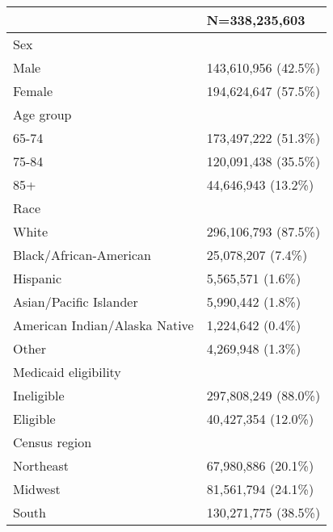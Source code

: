 \begin{table}[ht]
\centering
\begin{tabular}{ll}
  \hline
 & N=338,235,603 \\ 
  \hline
Sex &  \\ 
    \hspace{10pt}Male & 143,610,956 (42.5\%) \\ 
    \hspace{10pt}Female & 194,624,647 (57.5\%) \\ 
  Age group &  \\ 
    \hspace{10pt}65-74 & 173,497,222 (51.3\%) \\ 
    \hspace{10pt}75-84 & 120,091,438 (35.5\%) \\ 
    \hspace{10pt}85+ & 44,646,943 (13.2\%) \\ 
  Race &  \\ 
    \hspace{10pt}White & 296,106,793 (87.5\%) \\ 
    \hspace{10pt}Black/African-American & 25,078,207 (7.4\%) \\ 
    \hspace{10pt}Hispanic & 5,565,571 (1.6\%) \\ 
    \hspace{10pt}Asian/Pacific Islander & 5,990,442 (1.8\%) \\ 
    \hspace{10pt}American Indian/Alaska Native & 1,224,642 (0.4\%) \\ 
    \hspace{10pt}Other & 4,269,948 (1.3\%) \\ 
  Medicaid eligibility &  \\ 
    \hspace{10pt}Ineligible & 297,808,249 (88.0\%) \\ 
    \hspace{10pt}Eligible & 40,427,354 (12.0\%) \\ 
  Census region &  \\ 
    \hspace{10pt}Northeast & 67,980,886 (20.1\%) \\ 
    \hspace{10pt}Midwest & 81,561,794 (24.1\%) \\ 
    \hspace{10pt}South & 130,271,775 (38.5\%) \\ 

\end{tabular}
\end{table}
